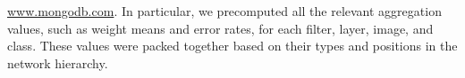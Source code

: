 \documentclass[format=acmsmall, review=false, screen=true]{acmart}
\begin{document}
{\url{www.mongodb.com}}. In particular, we precomputed all the relevant aggregation values, such as weight means and error rates, for each filter, layer, image, and class. These values were packed together based on their types and positions in the network hierarchy. %
\end{document}
